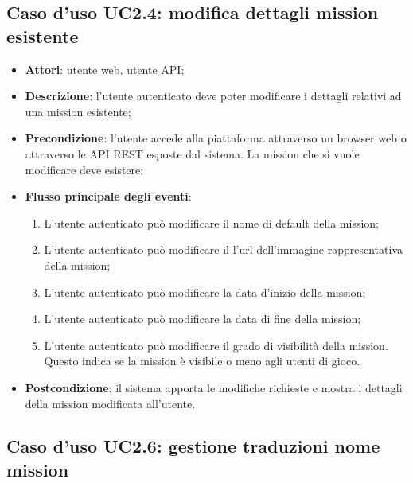 \subsection{Caso d'uso UC2.4: modifica dettagli mission esistente}
\begin{itemize}
\item \textbf{Attori}: utente web, utente API;
\item \textbf{Descrizione}: l'utente autenticato deve poter modificare i dettagli relativi ad una mission esistente; 
      \item \textbf{Precondizione}: l'utente accede alla piattaforma attraverso un browser web o attraverso le API REST esposte dal sistema. La mission che si vuole modificare deve esistere;

        \item \textbf{Flusso principale degli eventi}:
          \begin{enumerate}
          \item L'utente autenticato può modificare il nome di default della mission;
          \item L'utente autenticato può modificare il l'\gls{url}\glsfirstoccur{} dell'immagine rappresentativa della mission;
          \item L'utente autenticato può modificare la data d'inizio della mission;
          \item L'utente autenticato può modificare la data di fine della mission;
          \item L'utente autenticato può modificare il grado di visibilità della mission. Questo indica se la mission è visibile o meno agli utenti di gioco.

      \end{enumerate}
    \item \textbf{Postcondizione}: il sistema apporta le modifiche richieste e mostra i dettagli della mission modificata all'utente.
  \end{itemize}

\hypertarget{UC2.6}{}
\subsection{Caso d'uso UC2.6: gestione traduzioni nome mission}

